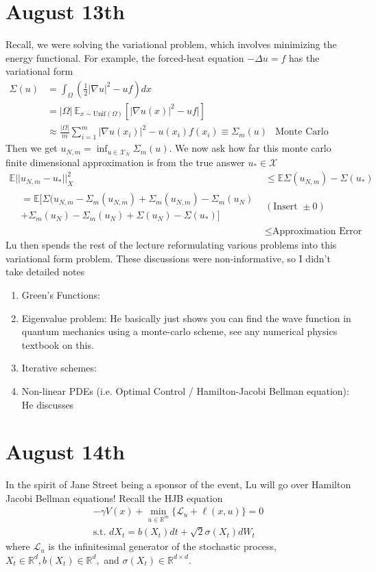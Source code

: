 \section{August 13th}
Recall, we were solving the variational problem, which involves minimizing the energy functional. For example, the forced-heat equation $-\Delta u = f$ has the variational form
\begin{align}
	\Sigma(u) & =  \int_\Omega (\frac{1}{2} |\nabla u|^2 - u f)dx\\
	& = |\Omega|~ \mathbb E_{x \sim \text{Unif}(\Omega)} [|\nabla u(x) |^2 - uf|]\\
	& \approx \frac{|\Omega|}{m} \sum_{i=1}^m |\nabla u(x_i)|^2 - u(x_i)f(x_i) \equiv \Sigma_m(u) & \text{Monte Carlo sampling}
\end{align}
Then we get $u_{N,m} = \inf_{u \in \mathcal X_N} \Sigma_m (u)$. We now ask how far this monte carlo finite dimensional approximation is from the true answer $u_* \in \mathcal X$
\begin{align}
	\mathbb E|| u_{N,m} - u_*||^2_{X} & \leq \mathbb E \Sigma(u_{N,m}) - \Sigma(u_*)\\
	  \begin{split}  & = \mathbb E \Big[ \Sigma(u_{N,m} - \Sigma_m(u_{N,m}) + \Sigma_m(u_{N,m})  - \Sigma_m (u_N) \\  & + \Sigma_m(u_N) - \Sigma_m(u_N) + \Sigma(u_N) - \Sigma(u_*) \Big] \end{split} & (\text{Insert } \pm 0) \\
	& \leq \text{Approximation Error}
\end{align}
Lu then spends the rest of the lecture reformulating various problems into this variational form problem. These discussions were non-informative, so I didn't take detailed notes
\begin{enumerate}
	\item Green's Functions:
	\item Eigenvalue problem: He basically just shows you can find the wave function in quantum mechanics using a monte-carlo scheme, see any numerical physics textbook on this.
	\item Iterative schemes:
	\item Non-linear PDEs (i.e. Optimal Control / Hamilton-Jacobi Bellman equation): He discusses 
\end{enumerate}



\section{August 14th}
In the spirit of Jane Street being a sponsor of the event, Lu will go over Hamilton Jacobi Bellman equations! Recall the HJB equation
\begin{align}
	- \gamma V(x) + \min_{u \in \mathbb R^m} \{\mathcal L_u  + \ell (x,u)\}= 0\\
	\text{s.t. }dX_t = b(X_t) dt + \sqrt{2} \sigma(X_t) dW_t
\end{align}
where $\mathcal L_u$ is the infinitesimal generator of the stochastic process, $X_t \in \mathbb R^d, b(X_t) \in \mathbb R^d,$ and $\sigma(X_t) \in \mathbb R^{d\times d}$.

